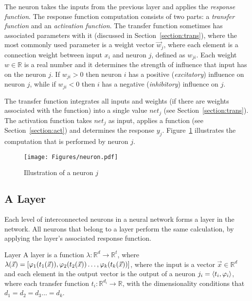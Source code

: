The neuron takes the inputs from the previous layer and applies the \textit{response function}. The response function computation consists of two parts: a \textit{transfer function} and an \textit{activation function}. The transfer function sometimes has associated parameters with it (discussed in Section~\ref{section:trans}), where the most commonly used parameter is a weight vector $\vec{w}_{j}$, where each element is a connection weight between input $x_i$ and neuron $j$, defined as $w_{ji}$. Each weight $w \in \mathbb{R}$ is a real number and it determines the strength of influence that input has on the neuron $j$. If $w_{ji}>0$ then neuron $i$ has a positive (\emph{excitatory}) influence on neuron $j$, while if $w_{ji}<0$ then $i$ has a negative (\emph{inhibitory}) influence on $j$.

The transfer function integrates all inputs and weights (if there are weights associated with the function) into a single value $net_j$ (see Section~\ref{section:trans}). The activation function takes $net_j$ as input, applies a function (see Section~\ref{section:act}) and determines the response $y_j$. Figure~\ref{fig:neuron} illustrates the computation that is performed by neuron $j$.


\begin{figure}[ht!]
	\begin{center}
		\texttt{[image: Figures/neuron.pdf]}
	\end{center}
	\caption{Illustration of a neuron $j$}
	\label{fig:neuron}
\end{figure} 



\subsection{A Layer}

Each level of interconnected neurons in a neural network forms a layer in the network. All neurons that belong to a layer perform the same calculation, by applying the layer's associated response function.

\begin{Definition}{Layer}{}
A layer is a function $\lambda: \mathbb{R}^d \to \mathbb{R}^t$, where $\lambda(\vec{x}) = [\varphi_1(t_1(\vec{x})), \varphi_2(t_2(\vec{x})) \dots, \varphi_k(t_k(\vec{x}))] $, where the input is a vector $\vec{x}\in \mathbb{R}^d$ and each element in the output vector is the output of a neuron $j_i = \langle t_i, \varphi_i \rangle$, where each transfer function $t_i:\mathbb{R}^{d_i} \to \mathbb{R}$, with the dimensionality
conditions that $d_1 = d_2 = d_3 \dots = d_k$.
\end{Definition}

